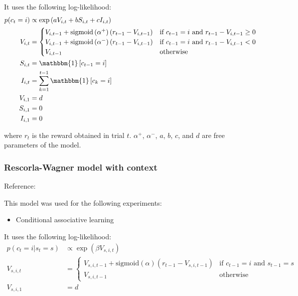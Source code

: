 \documentclass[pdflatex,sn-nature]{sn-jnl}%
\theoremstyle{thmstyleone}%
\theoremstyle{thmstyletwo}%
\theoremstyle{thmstylethree}%
\begin{document}
\noindent It uses the following log-likelihood:
\begin{align*}
    p(c_t = i) &\propto \exp\left(a V_{i,t} + b S_{i,t} + c I_{i,t} \right) \\
    V_{i,t} &=  
    \begin{cases} 
        V_{i, t-1} + \text{sigmoid}\left(\alpha^+\right) \left(r_{t-1} - V_{i, t-1}  \right) & \text{if } c_{t-1} = i \text{ and } r_{t-1} - V_{i, t-1} \geq 0 \\
        V_{i, t-1} + \text{sigmoid}\left(\alpha^-\right) \left(r_{t-1} - V_{i, t-1}  \right) & \text{if } c_{t-1} = i \text{ and } r_{t-1} - V_{i, t-1} < 0 \\
        V_{i, t-1}             & \text{otherwise}
    \end{cases} \\
    S_{i,t} &= \mathbbm{1}\left[c_{t-1} = i\right] \\
    I_{i,t} &= \sum_{k=1}^{t-1} \mathbbm{1}\left[c_k = i\right]\\
    V_{i,1} &= d \\
    S_{i,1} &= 0 \\
    I_{i,1} &= 0
\end{align*}

\noindent where $r_t$ is the reward obtained in trial $t$. $\alpha^+$, $\alpha^-$, $a$, $b$, $c$, and $d$ are free parameters of the model.

\subsubsection*{Rescorla-Wagner model with context}

Reference: \cite{sutton2018reinforcement} 

\noindent This model was used for the following experiments:
\begin{itemize}
    \item Conditional associative learning
\end{itemize}

\noindent It uses the following log-likelihood:
\begin{align*}
    p(c_t = i | s_t = s) &\propto \exp\left(\beta V_{s,i,t} \right) \\
    V_{s,i, t} &=  
    \begin{cases} 
        V_{s,i, t-1} + \text{sigmoid}\left(\alpha\right) \left(r_{t-1} - V_{s,i,t-1}  \right) & \text{if } c_{t-1} = i \text{ and } s_{t-1} = s \\
        V_{s,i,t-1}             & \text{otherwise}
    \end{cases} \\
    V_{s,i,1} &= d 
\end{align*}
\end{document}

